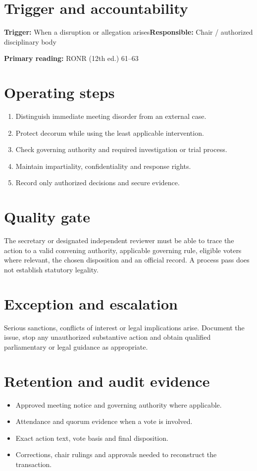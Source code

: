 \documentclass[11pt]{article}
\begin{document}
\SuiteOpen
{}
\section{Trigger and accountability}
\textbf{Trigger:} When a disruption or allegation arises\quad\textbf{Responsible:} Chair / authorized disciplinary body

\textbf{Primary reading:} RONR (12th ed.) 61--63

\section{Operating steps}
\begin{enumerate}[leftmargin=*,itemsep=4pt]
\item Distinguish immediate meeting disorder from an external case.
\item Protect decorum while using the least applicable intervention.
\item Check governing authority and required investigation or trial process.
\item Maintain impartiality, confidentiality and response rights.
\item Record only authorized decisions and secure evidence.
\end{enumerate}

\section{Quality gate}
The secretary or designated independent reviewer must be able to trace the action to a valid convening authority, applicable governing rule, eligible voters where relevant, the chosen disposition and an official record. A process pass does not establish statutory legality.

\section{Exception and escalation}
Serious sanctions, conflicts of interest or legal implications arise. Document the issue, stop any unauthorized substantive action and obtain qualified parliamentary or legal guidance as appropriate.

\section{Retention and audit evidence}
\begin{itemize}[leftmargin=*,itemsep=4pt]
\item Approved meeting notice and governing authority where applicable.
\item Attendance and quorum evidence when a vote is involved.
\item Exact action text, vote basis and final disposition.
\item Corrections, chair rulings and approvals needed to reconstruct the transaction.
\end{itemize}
\end{document}
